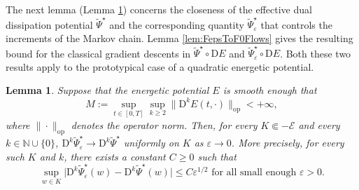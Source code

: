 \documentclass[reqno]{amsart}
\newtheorem{lemma}[theorem]{Lemma}
\theoremstyle{definition}
\begin{document}
The next lemma (Lemma \ref{lem:FepsToF0}) concerns the closeness of the effective dual dissipation potential ${\widetilde{\Psi}}^{\star}$ and the corresponding quantity ${\widetilde{\Psi}}_{\varepsilon}^{\star}$ that controls the increments of the Markov chain.  Lemma \ref{lem:FepsToF0Flows} gives the resulting bound for the classical gradient descents in ${\widetilde{\Psi}}^{\star} \circ {\mathrm{D}} E$ and ${\widetilde{\Psi}}_{\varepsilon}^{\star} \circ {\mathrm{D}} E$.  Both these two results apply to the prototypical case of a quadratic energetic potential.

\begin{lemma}
	\label{lem:FepsToF0}
	Suppose that the energetic potential $E$ is smooth enough that
	\[
		M := \sup_{t \in [0, T]} \sup_{k \geq 2} \big\| {\mathrm{D}}^{k} E(t, \cdot) \big\|_{\mathrm{op}} < + \infty,
	\]
	where $\| \cdot \|_{\mathrm{op}}$ denotes the operator norm.  Then, for every $K \Subset - {\mathcal{E}}$ and every $k \in \mathbb{N} \cup \{ 0 \}$, ${\mathrm{D}}^{k} {\widetilde{\Psi}}_{\varepsilon}^{\star} \to {\mathrm{D}}^{k} {\widetilde{\Psi}}^{\star}$ uniformly on $K$ as ${\varepsilon} \to 0$.  More precisely, for every such $K$ and $k$, there exists a constant $C \geq 0$ such that
	\[
		\sup_{w \in K} \big| {\mathrm{D}}^{k} {\widetilde{\Psi}}_{\varepsilon}^{\star} (w) - {\mathrm{D}}^{k} {\widetilde{\Psi}}^{\star} (w) \big| \leq C {\varepsilon}^{1/2} \text{ for all small enough } {\varepsilon} > 0.
	\]
\end{lemma}
\end{document}
